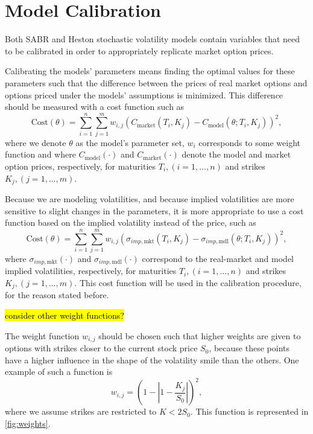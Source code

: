 
 
\section{Model Calibration}
\label{section:Model Calibration}
Both SABR and Heston stochastic volatility models contain variables that need to be calibrated in order to appropriately replicate market option prices.


Calibrating the models' parameters means finding the optimal values for these parameters such that the difference between the prices of real market options and options priced under the models' assumptions is minimized. This difference should be measured with a cost function such as
\begin{equation}
\mathrm{Cost}(\theta)=\sum_{i=1}^n\sum_{j=1}^mw_{i,j}\left(C_{\mathrm{market}}(T_i,K_j)-C_{\mathrm{model}}(\theta;T_i,K_j)\right)^2,
\end{equation}
\noindent where we denote $\theta$ as the model's parameter set, $w_i$ corresponds to some weight function and where $C_{\mathrm{model}}(\cdot)$ and $C_{\mathrm{market}}(\cdot)$ denote the model and market option prices, respectively, for maturities $T_i,(i=1,\ldots,n)$ and strikes $K_j,(j=1,\ldots,m)$.

Because we are modeling volatilities, and because implied volatilities are more sensitive to slight changes in the parameters, it is more appropriate to use a cost function based on the implied volatility instead of the price, such as
\begin{equation}\label{cost}
\boxed{\mathrm{Cost}(\theta)=\sum_{i=1}^n\sum_{j=1}^mw_{i,j}\left(\sigma_{imp,\mathrm{mkt}}(T_i,K_j)-\sigma_{imp,\mathrm{mdl}}(\theta;T_i,K_j)\right)^2,}
\end{equation}
\noindent where $\sigma_{imp,\mathrm{mkt}}(\cdot)$ and $\sigma_{imp,\mathrm{mdl}}(\cdot)$ correspond to the real-market and model implied volatilities, respectively, for maturities $T_i,(i=1,\ldots,n)$ and strikes $K_j,(j=1,\ldots,m)$. This cost function will be used in the calibration procedure, for the reason stated before.

\hl{consider other weight functions?}


The weight function $w_{i,j}$ should be chosen such that higher weights are given to options with strikes closer to the current stock price $S_0$, because these points have a higher influence in the shape of the volatility smile than the others.
One example of such a function is
\begin{equation}\label{weight}
w_{i,j}=\left(1-\left|1-\frac{K_j}{S_0}\right|\right)^2,
\end{equation}
\noindent where we assume strikes are restricted to $K<2S_0$.
This function is represented in \autoref{fig:weights}.
    
